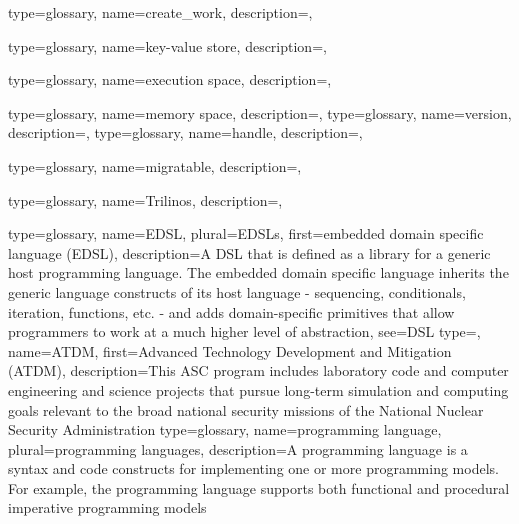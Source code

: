 {
  type=glossary,
  name=create_work,
  description={},
}

{
  type=glossary,
  name=key-value store,
  description={},
}

{
  type=glossary,
  name={execution space},
  description={},
}

{
  type=glossary,
  name={memory space},
  description={},
}
{
  type=glossary,
  name=version,
  description={},
}
{
  type=glossary,
  name=handle,
  description={},
}

{
  type=glossary,
  name=migratable,
  description={},
}

{
  type=glossary,
  name=Trilinos,
  description={},
}

{
  type=glossary,
  name={EDSL},
  plural={EDSLs},
  first={embedded domain specific language (EDSL)},
  description={A \gls{DSL} that is defined as a library for a
    generic host programming language. The embedded domain specific language
      inherits the generic language constructs of its host language -
      sequencing, conditionals, iteration, functions, etc. - and adds
      domain-specific primitives that allow programmers to work at a much
      higher level of abstraction},
  see={DSL}
}
{
  type=\acronymtype,
  name={ATDM},
  first={Advanced Technology Development and Mitigation (ATDM)},
  description={This \gls{ASC} program includes laboratory code and computer engineering and science projects that pursue long-term simulation and computing goals relevant to the broad national security missions of the National Nuclear Security Administration}
}
{
  type=glossary,
  name={programming language},
  plural={programming languages},
  description={A programming language is a syntax and code constructs for
    implementing one or more \glspl{programming model}.
  For example, the \CC{} programming language supports both \gls{functional} and
    \gls{procedural} \gls{imperative} \glspl{programming model}}
}

